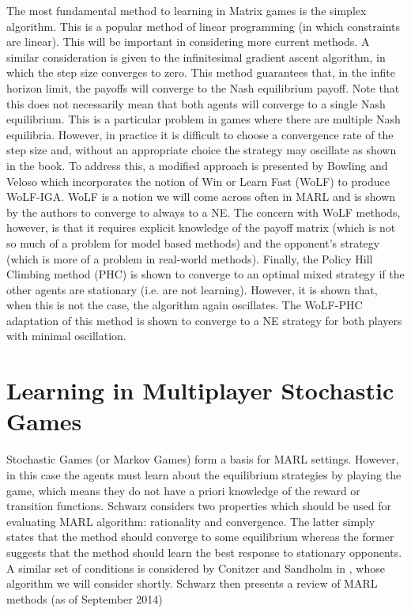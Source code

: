 \documentclass[../sample.tex]{subfiles}
\begin{document}
The most fundamental method to learning in Matrix games is the simplex algorithm. This is a popular
method of linear programming (in which constraints are linear). This will be important in
considering more current methods. A similar consideration is given to the infinitesimal gradient
ascent algorithm, in which the step size converges to zero. This method guarantees that, in the
infite horizon limit, the payoffs will converge to the Nash equilibrium payoff. Note that this does
not necessarily mean that both agents will converge to a single Nash equilibrium. This is a
particular problem in games where there are multiple Nash equilibria. However, in practice it is
difficult to choose a convergence rate of the step size and, without an appropriate choice the
strategy may oscillate as shown in the book. To address this, a modified approach is presented by
Bowling and Veloso which incorporates the notion of Win or Learn Fast (WoLF) to produce WoLF-IGA.
WoLF is a notion we will come across often in MARL and is shown by the authors to converge to always
to a NE. The concern with WoLF methods, however, is that it requires explicit knowledge of the
payoff matrix (which is not so much of a problem for model based methods) and the opponent's
strategy (which is more of a problem in real-world methods). Finally, the Policy Hill Climbing
method (PHC) is shown to converge to an optimal mixed strategy if the other agents are stationary
(i.e. are not learning). However, it is shown that, when this is not the case, the algorithm again
oscillates. The WoLF-PHC adaptation of this method is shown to converge to a NE strategy for both
players with minimal oscillation. 


\section{Learning in Multiplayer Stochastic Games}

Stochastic Games (or Markov Games) form a basis for MARL settings. However, in this case the agents
must learn about the equilibrium strategies by playing the game, which means they do not have a
priori knowledge of the reward or transition functions. Schwarz considers two properties which
should be used for evaluating MARL algorithm: rationality and convergence. The latter simply states
that the method should converge to some equilibrium whereas the former suggests that the method
should learn the best response to stationary opponents. A similar set of conditions is considered by
Conitzer and Sandholm in \cite{ConitzerAWESOME:}, whose algorithm we will consider shortly. Schwarz
then presents a review of MARL methods (as of September 2014)
\end{document}
